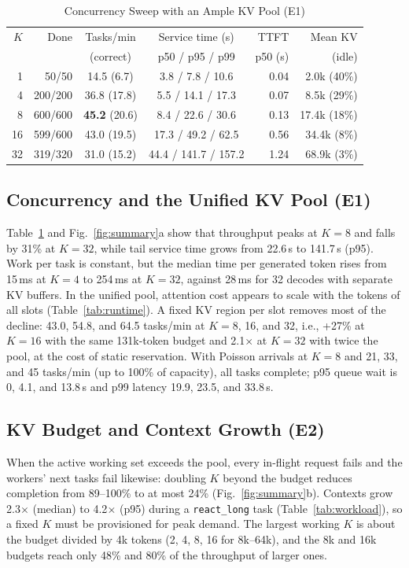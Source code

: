 \documentclass[conference]{IEEEtran}
\newcommand{\K}{$K$}
\begin{document}
\begin{table}[t]
  \caption{Concurrency Sweep with an Ample KV Pool (E1)}
  \label{tab:e1}
  \centering
  \footnotesize
  \setlength{\tabcolsep}{3pt}
  \begin{tabular}{@{}rrccrr@{}}
    \toprule
    \K{} & Done & Tasks/min & Service time (s) & TTFT & Mean KV \\
     & & (correct) & p50 / p95 / p99 & p50 (s) & (idle) \\
    \midrule
    1 & 50/50 & 14.5 (6.7) & 3.8 / 7.8 / 10.6 & 0.04 & 2.0k (40\%) \\
    4 & 200/200 & 36.8 (17.8) & 5.5 / 14.1 / 17.3 & 0.07 & 8.5k (29\%) \\
    8 & 600/600 & \textbf{45.2} (20.6) & 8.4 / 22.6 / 30.6 & 0.13 & 17.4k (18\%) \\
    16 & 599/600 & 43.0 (19.5) & 17.3 / 49.2 / 62.5 & 0.56 & 34.4k (8\%) \\
    32 & 319/320 & 31.0 (15.2) & 44.4 / 141.7 / 157.2 & 1.24 & 68.9k (3\%) \\
    \bottomrule
  \end{tabular}
\end{table}

\subsection{Concurrency and the Unified KV Pool (E1)}
Table~\ref{tab:e1} and Fig.~\ref{fig:summary}a show that throughput peaks at $K=8$ and falls by 31\% at
$K=32$, while tail service time grows from 22.6\,s to 141.7\,s (p95). Work per task is constant, but the
median time per generated token rises from 15\,ms at $K=4$ to 254\,ms at $K=32$, against 28\,ms for 32
decodes with separate KV buffers. In the unified pool, attention cost appears to scale with the tokens of
all slots (Table~\ref{tab:runtime}). A fixed KV region per slot removes most of the decline: 43.0, 54.8,
and 64.5 tasks/min at $K=8$, 16, and 32, i.e., +27\% at $K=16$ with the same 131k-token budget and
2.1$\times$ at $K=32$ with twice the pool, at the cost of static reservation. With Poisson arrivals at
$K=8$ and 21, 33, and 45 tasks/min (up to 100\% of capacity), all tasks complete; p95 queue wait is 0,
4.1, and 13.8\,s and p99 latency 19.9, 23.5, and 33.8\,s.

\subsection{KV Budget and Context Growth (E2)}
When the active working set exceeds the pool, every in-flight request fails and the workers' next tasks
fail likewise: doubling \K{} beyond the budget reduces completion from 89--100\% to at most 24\%
(Fig.~\ref{fig:summary}b). Contexts grow 2.3$\times$ (median) to 4.2$\times$ (p95) during a
\texttt{react\_long} task (Table~\ref{tab:workload}), so a fixed \K{} must be provisioned for peak
demand. The largest working \K{} is about the budget divided by 4k tokens (2, 4, 8, 16 for 8k--64k), and
the 8k and 16k budgets reach only 48\% and 80\% of the throughput of larger ones.
\end{document}
